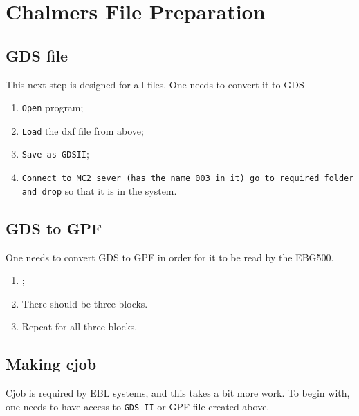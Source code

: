 
\section{Chalmers File Preparation}

  \subsection{GDS file}
   This next step is designed for all files. One needs to convert it to GDS
   
   \begin{enumerate}
   	\item \texttt{Open} \textbf{} program;
   	\item \texttt{Load} the dxf file from above;
   	\item \texttt{Save as GDSII};
   	\item \texttt{Connect to MC2 sever (has the name 003 in it) \ra go to required folder and drop} so that it is in the system.
   \end{enumerate}

  \subsection{GDS to GPF}
   One needs to convert GDS to GPF in order for it to be read by the EBG500.
   \begin{enumerate}
   	\item {};
   	\item There should be three blocks. 
   	\item Repeat for all three blocks.
   \end{enumerate}
  
  \subsection{Making cjob}
   Cjob is required by EBL systems, and this takes a bit more work. To begin with, one needs to have access to \texttt{GDS II} or GPF file created above.
   

